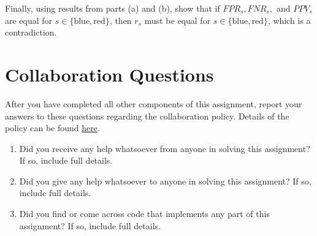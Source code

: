 \documentclass[11pt,addpoints,answers]{exam}
\begin{document}
\begin{questions}
\begin{parts}
\begin{subparts}
    \subpart[4] Finally, using results from parts (a) and (b), show that if $FPR_s, FNR_s,$ and $PPV_s$ are equal for $s \in \{\text{blue}, \text{red}\}$, then $r_s$ must be equal for $s \in \{\text{blue}, \text{red}\}$, which is a contradiction.

    \begin{your_solution}[width = \linewidth,height=10cm]
    \end{your_solution}
\end{subparts}


\end{parts} 
\newpage
\section{Collaboration Questions}
After you have completed all other components of this assignment, report your answers to these questions regarding the collaboration policy. Details of the policy can be found \href{http://www.cs.cmu.edu/~mgormley/courses/10601/syllabus.html}{here}.
\begin{enumerate}
    \item Did you receive any help whatsoever from anyone in solving this assignment? If so, include full details.
    \item Did you give any help whatsoever to anyone in solving this assignment? If so, include full details.
    \item Did you find or come across code that implements any part of this assignment? If so, include full details.
\end{enumerate}

\begin{your_solution}[height=6cm]

\end{your_solution}
\end{questions}
\end{document}
